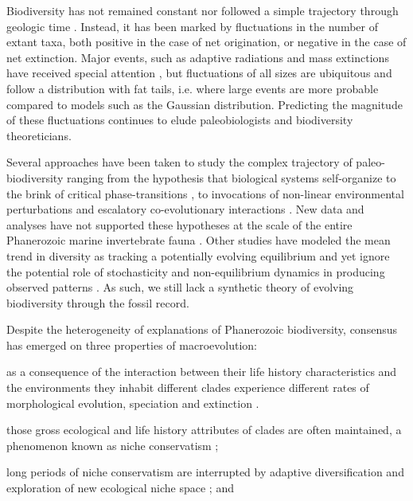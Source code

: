 \documentclass[12pt]{article}
\let\citep=\cite
\begin{document}
Biodiversity has not remained constant nor followed a simple
trajectory through geologic time \citep{raup1982, sepkoski1984,
  gilinsky1994, liow2007, alroy08, alroy2010}.  Instead, it has been
marked by fluctuations in the number of extant taxa, both positive in
the case of net origination, or negative in the case of net
extinction. Major events, such as adaptive radiations and mass
extinctions have received special attention \citep{benton1995,
  Erwin1998}, but fluctuations of all sizes are ubiquitous
\citep{sepkoski1984, alroy08, quental2013} and follow a distribution
with fat tails, i.e. where large events are more probable compared to
models such as the Gaussian distribution. Predicting the magnitude
of these fluctuations continues to elude paleobiologists and
biodiversity theoreticians.

Several approaches have been taken to study the complex trajectory of
paleo-biodiversity ranging from the hypothesis that biological systems
self-organize to the brink of critical phase-transitions
\citep{bak1993, sole1997}, to invocations of non-linear environmental
perturbations \citep{newman1995} and escalatory co-evolutionary
interactions \citep{vermeij1987}. New data and analyses have not
supported these hypotheses at the scale of the entire
Phanerozoic marine invertebrate fauna \citep{kirchner1998, madin2006,
  alroy08}. Other studies have modeled the mean trend in diversity as
tracking a potentially evolving equilibrium \citep{sepkoski1984,
  alroy08, alroy2010, rabosky2009ecolLett} and yet ignore the
potential role of stochasticity and non-equilibrium dynamics in
producing observed patterns \citep{erwin2012, liow2007,
  quental2013}. As such, we still lack a synthetic theory of evolving
biodiversity through the fossil record.

Despite the heterogeneity of explanations of Phanerozoic
biodiversity, consensus has emerged on three properties of
macroevolution:
\begin{inparaenum}
\item as a consequence of the interaction between their life history
  characteristics and the environments they inhabit \citep{vrba1983}
  different clades experience different rates of morphological
  evolution, speciation and extinction \citep{simpson1953,
    sepkoski1984, holman1989, gilinsky1994}.
\item those gross ecological and life history attributes of clades
  are often maintained, a phenomenon known as niche conservatism
  \citep{roy2009range, hopkins2014};
\item long periods of niche conservatism are interrupted by adaptive
  diversification and exploration of new ecological niche space
  \citep{eldredgeGould1972, newman1985adaptive, hopkins2014}; and
\end{inparaenum}
\end{document}
